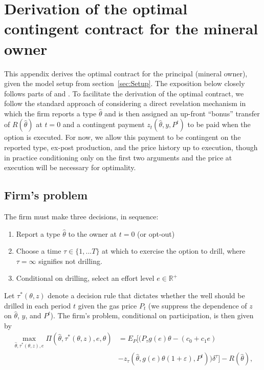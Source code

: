 \documentclass[12pt]{article}
\begin{document}
\section{Derivation of the optimal contingent contract for the mineral owner \label{appx:optcontract}}

This appendix derives the optimal contract for the principal (mineral owner), given the model setup from section~\ref{sec:Setup}. The exposition below closely follows parts of \citet{bib:laffonttirole1986} and \citet{bib:board}. To facilitate the derivation of the optimal contract, we follow the standard approach of considering a direct revelation mechanism in which the firm reports a type $\hat{\theta}$ and is then assigned an up-front ``bonus'' transfer of $R(\hat{\theta})$ at $t=0$ and a contingent payment $z_t(\hat{\theta},y,P^t)$ to be paid when the option is executed. For now, we allow this payment to be contingent on the reported type, ex-post production, and the price history up to execution, though in practice conditioning only on the first two arguments and the price at execution will be necessary for optimality.


\subsection{Firm's problem \label{appx:FirmProb}}

The firm must make three decisions, in sequence:
\begin{enumerate}
\item Report a type $\hat{\theta}$ to the owner at $t=0$ (or opt-out)
\item Choose a time $\tau\in\{1,...T\}$ at which to exercise the option to drill, where $\tau=\infty$ signifies not drilling.
\item Conditional on drilling, select an effort level $e\in\mathbb{R}^+$
\end{enumerate}

Let $\tau^*(\theta,z)$ denote a decision rule that dictates whether the well should be drilled in each period $t$ given the gas price $P_t$ (we suppress the dependence of $z$ on $\hat{\theta}$, $y$, and $P^t$). The firm's problem, conditional on participation, is then given by
\begin{align}
\max_{\hat{\theta},\tau^*(\theta,z),e}\Pi(\hat{\theta},\tau^*(\theta,z),e,\theta)&=E_P[(P_\tau g(e)\theta-(c_0+c_1e) \nonumber \\
&-z_\tau(\hat{\theta},g(e)\theta(1+\varepsilon),P^t))\delta^\tau]-R(\hat{\theta}), \label{eq:firmprob}
\end{align}
\end{document}

